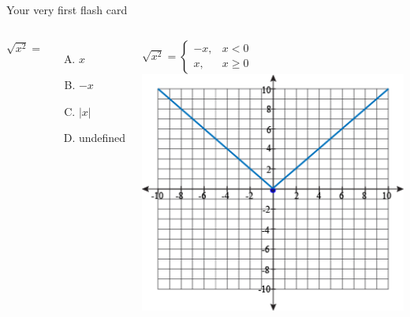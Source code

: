 \documentclass{beamer}
\begin{document}
\begin{frame}{Your very first flash card} \vspace{10 pt}
\begin{columns}[onlytextwidth]
$\sqrt{x^2}=$ \\ [10 pt]
\begin{enumerate}[(A)]
\item $x$
\item $-x$
\item $|x|$
\item undefined
\end{enumerate}
{
$ 
\sqrt{x^2} =
\begin{cases}
-x, & x<0 \\
x, & x \geq 0
\end{cases}
$ \\[10pt]
}
{
\includegraphics[scale=0.45]{squaredroot}
}
\end {columns}
\end{frame}






\end{document}
